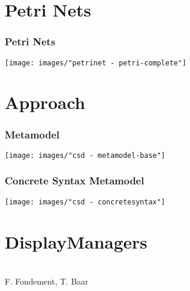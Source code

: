 \section*{Petri Nets}
\begin{frame}
  \frametitle{Petri Nets}
  \centering
  \hspace{-2cm}
  \texttt{[image: images/"petrinet - petri-complete"]}
\end{frame}



\section{Approach}
\begin{frame}
  \centering
  \hspace{-1cm}
  \huge
\end{frame}


\begin{frame}
  \frametitle{Metamodel}
  \centering
  \hspace{-1cm}
  \texttt{[image: images/"csd - metamodel-base"]}
\end{frame}

\begin{frame}
  \frametitle{Concrete Syntax Metamodel}
  \hspace{-1cm}
  \texttt{[image: images/"csd - concretesyntax"]}
\end{frame}

\section*{DisplayManagers}
\begin{frame}
  \hspace{-1cm}
  \large
   \\
  \hspace{-1cm}
  \small
  F. Fondement, T. Baar \cite{fondement_making_2005}
\end{frame}

